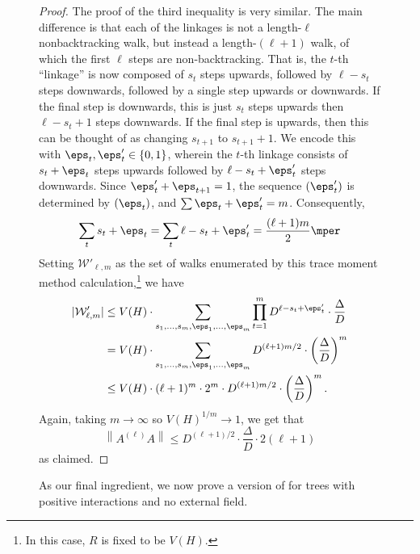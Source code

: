 \documentclass[11pt,letterpaper]{article}
\begin{document}
\begin{figure}
\begin{proof}
        The proof of the third inequality is very similar.
        The main difference is that each of the linkages is not a length-$\ell$ nonbacktracking walk, but instead a length-$(\ell+1)$ walk, of which the first $\ell$ steps are non-backtracking. That is, the $t$-th ``linkage'' is now composed of $s_t$ steps upwards, followed by $\ell-s_t$ steps downwards, followed by a single step upwards or downwards.
        If the final step is downwards, this is just $s_t$ steps upwards then $\ell - s_t + 1$ steps downwards. 
        If the final step is upwards, then this can be thought of as changing $s_{t+1}$ to $s_{t+1} + 1$.
        We encode this with $\eps_t, \eps'_t \in \{0,1\}$, wherein the $t$-th linkage consists of $s_t + \eps_t$ steps upwards followed by $\ell - s_t + \eps'_t$ steps downwards. Since $\eps'_t+\eps_{t+1}=1$, the sequence $(\eps'_t)$ is determined by $(\eps_t)$, and $\sum \eps_t + \eps'_t = m$. Consequently,
        \[
            \sum_{t} s_t + \eps_t = \sum_{t} \ell - s_t + \eps'_t = \frac{(\ell+1)m}{2}\mper
        \]
        Setting $\mathcal{W}'_{\ell,m}$ as the set of walks enumerated by this trace moment method calculation,\footnote{In this case, $R$ is fixed to be $V(H)$.} we have
        \begin{align*}
            |\mathcal{W}'_{\ell,m}| &\le V(H) \cdot \sum_{s_1,\ldots,s_m,\eps_1,\ldots,\eps_m} \prod_{t=1}^{m} D^{\ell - s_t + \eps'_t} \cdot \frac{\Delta}{D} \\
                &= V(H) \cdot \sum_{s_1,\ldots,s_m,\eps_1,\ldots,\eps_m} D^{(\ell+1)m/2} \cdot \left(\frac{\Delta}{D}\right)^m \\
                &\le V(H) \cdot (\ell+1)^m \cdot 2^m \cdot D^{(\ell+1)m/2} \cdot \left( \frac{\Delta}{D} \right)^m.
        \end{align*}
        Again, taking $m\to\infty$ so $V(H)^{1/m} \to 1$, we get that 
        \[ \left\| A^{(\ell)} A \right\| \le D^{(\ell+1)/2} \cdot \frac{\Delta}{D} \cdot 2 (\ell+1) \]
        as claimed.
    \end{proof}

    As our final ingredient, we now prove a version of  for trees with positive interactions and no external field.


\end{figure}
\end{document}
